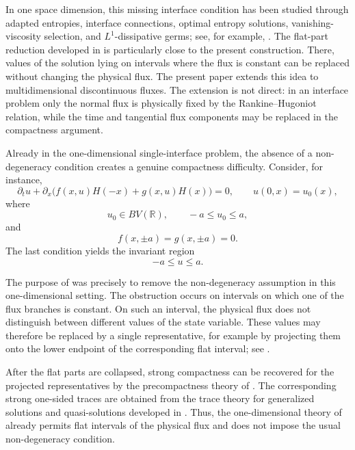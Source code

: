 \documentclass[11pt]{amsart}
\numberwithin{equation}{section}
\theoremstyle{plain}
\theoremstyle{definition}
\theoremstyle{remark}
\begin{document}
In one space dimension, this missing interface condition has been studied
through adapted entropies, interface connections, optimal entropy solutions,
vanishing-viscosity selection, and \(L^1\)-dissipative germs; see, for example,
\cite{AdimurthiJHDE2005,AKR-NHM,AKR,AudussePerthame2005}. The flat-part
reduction developed in \cite{Mitrovic2011} is particularly close to the
present construction. There, values of the solution lying on intervals where
the flux is constant can be replaced without changing the physical flux. The
present paper extends this idea to multidimensional discontinuous fluxes. The
extension is not direct: in an interface problem only the normal flux is
physically fixed by the Rankine--Hugoniot relation, while the time and
tangential flux components may be replaced in the compactness argument.

Already in the one-dimensional single-interface problem, the absence of a
non-degeneracy condition creates a genuine compactness difficulty. Consider,
for instance,
\begin{equation}\label{eq:intro-one-dimensional-interface}
    \partial_t u
    +
    \partial_x
    \bigl(
        f(x,u)H(-x)+g(x,u)H(x)
    \bigr)
    =
    0,
    \qquad
    u(0,x)=u_0(x),
\end{equation}
where
\[
    u_0\in BV(\mathbb R),
    \qquad
    -a\leq u_0\leq a,
\]
and
\[
    f(x,\pm a)=g(x,\pm a)=0 .
\]
The last condition yields the invariant region
\[
    -a\leq u\leq a .
\]

The purpose of \cite{Mitrovic2011} was precisely to remove the
non-degeneracy assumption in this one-dimensional setting. The obstruction
occurs on intervals on which one of the flux branches is constant. On such an
interval, the physical flux does not distinguish between different values of
the state variable. These values may therefore be replaced by a single
representative, for example by projecting them onto the lower endpoint of the
corresponding flat interval; see
\cite[Lemma~2.3, formula~(27)]{Mitrovic2011}.

After the flat parts are collapsed, strong compactness can be recovered for
the projected representatives by the precompactness theory of
\cite{Panov_arma}. The corresponding strong one-sided traces are obtained
from the trace theory for generalized solutions and quasi-solutions developed
in \cite{pan_traces,PanovTraces2007}. Thus, the one-dimensional theory of
\cite{Mitrovic2011} already permits flat intervals of the physical flux and
does not impose the usual non-degeneracy condition.
\end{document}
